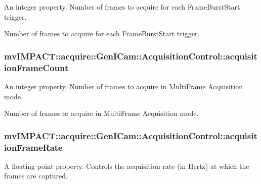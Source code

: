 An integer property. Number of frames to acquire for each Frame\+Burst\+Start trigger. 

Number of frames to acquire for each Frame\+Burst\+Start trigger. \hypertarget{classmv_i_m_p_a_c_t_1_1acquire_1_1_gen_i_cam_1_1_acquisition_control_a30953769d4d702d7a24cabd86d608bee}{
\subsubsection[{acquisition\+Frame\+Count}]{ mv\+I\+M\+P\+A\+C\+T\+::acquire\+::\+Gen\+I\+Cam\+::\+Acquisition\+Control\+::acquisition\+Frame\+Count}}\label{classmv_i_m_p_a_c_t_1_1acquire_1_1_gen_i_cam_1_1_acquisition_control_a30953769d4d702d7a24cabd86d608bee}


An integer property. Number of frames to acquire in Multi\+Frame Acquisition mode. 

Number of frames to acquire in Multi\+Frame Acquisition mode. \hypertarget{classmv_i_m_p_a_c_t_1_1acquire_1_1_gen_i_cam_1_1_acquisition_control_a6439ee2ea1b4b18f4387922ad18aa9c2}{
\subsubsection[{acquisition\+Frame\+Rate}]{ mv\+I\+M\+P\+A\+C\+T\+::acquire\+::\+Gen\+I\+Cam\+::\+Acquisition\+Control\+::acquisition\+Frame\+Rate}}\label{classmv_i_m_p_a_c_t_1_1acquire_1_1_gen_i_cam_1_1_acquisition_control_a6439ee2ea1b4b18f4387922ad18aa9c2}


A floating point property. Controls the acquisition rate (in Hertz) at which the frames are captured. 

